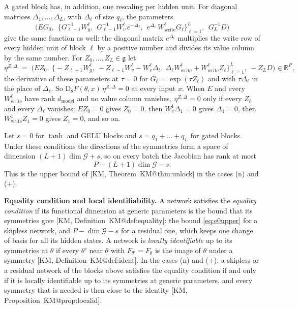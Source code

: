 \documentclass[10pt]{article}
\makeatletter
\theoremstyle{definition}
\theoremstyle{remark}
\newcommand{\R}{\mathbb{R}}
\newcommand{\Wwrite}{W_{\mathrm{write}}}
\newcommand{\dm}{d_{\mathrm{model}}}
\newcommand{\Der}{\mathrm{D}}
\newcommand{\G}{\mathcal{G}}
\newcommand{\para}[1]{\smallskip\noindent\textbf{#1}\hspace{0.5em}}
\newcommand{\KMn}[1]{\csname KM@#1\endcsname}
\newcommand{\KM}[2]{[KM, #1~\KMn{#2}]}
\makeatother
\begin{document}
A gated block has, in addition, one rescaling per hidden unit. For diagonal matrices $\Delta_1, \dots, \Delta_L$, with $\Delta_\ell$ of size $q_\ell$, the parameters
\[
\Big(EG_0,\ \ \big\{G_{\ell-1}^{-1}W_g^{\ell},\ \ G_{\ell-1}^{-1}W_v^{\ell}\,e^{-\Delta_\ell},\ \ e^{\Delta_\ell}\,\Wwrite^{\ell}G_\ell\big\}_{\ell=1}^{L},\ \ G_L^{-1}D\Big)
\]
give the same function as well: the diagonal matrix $e^{\Delta_\ell}$ multiplies the write row of every hidden unit of block $\ell$ by a positive number and divides its value column by the same number. For $Z_0, \dots, Z_L \in \mathfrak g$ let
\begin{equation}\label{eq:gteta}
\eta^{Z,\Delta} \;=\; \Big(EZ_0,\ \big\{-Z_{\ell-1}W_g^{\ell},\ -Z_{\ell-1}W_v^{\ell} - W_v^{\ell}\Delta_\ell,\ \Delta_\ell\Wwrite^{\ell} + \Wwrite^{\ell}Z_\ell\big\}_{\ell=1}^{L},\ -Z_LD\Big) \in \R^P ,
\end{equation}
the derivative of these parameters at $\tau = 0$ for $G_\ell = \exp(\tau Z_\ell)$ and with $\tau\Delta_\ell$ in the place of $\Delta_\ell$. So $\Der_\theta F(\theta, x)\,\eta^{Z,\Delta} = 0$ at every input $x$. When $E$ and every $\Wwrite^{\ell}$ have rank $\dm$ and no value column vanishes, $\eta^{Z,\Delta} = 0$ only if every $Z_\ell$ and every $\Delta_\ell$ vanishes: $EZ_0 = 0$ gives $Z_0 = 0$, then $W_v^{1}\Delta_1 = 0$ gives $\Delta_1 = 0$, then $\Wwrite^{1}Z_1 = 0$ gives $Z_1 = 0$, and so on.

Let $s = 0$ for $\tanh$ and GELU blocks and $s = q_1 + \dots + q_L$ for gated blocks. Under these conditions the directions of the symmetries form a space of dimension $(L+1)\dim\G + s$, so on every batch the Jacobian has rank at most
\begin{equation}\label{eq:e0upper}
P - (L+1)\dim\G - s .
\end{equation}
This is the upper bound of \KM{Theorem}{thm:unlock} in the cases (n) and (+).

\para{Equality condition and local identifiability.} A network satisfies the \emph{equality condition} if its functional dimension at generic parameters is the bound that its symmetries give \KM{Definition}{def:equality}: the bound \eqref{eq:e0upper} for a skipless network, and $P - \dim\G - s$ for a residual one, which keeps one change of basis for all its hidden states. A network is \emph{locally identifiable} up to its symmetries at $\theta$ if every $\theta'$ near $\theta$ with $F_{\theta'} = F_\theta$ is the image of $\theta$ under a symmetry \KM{Definition}{def:ident}. In the cases (n) and (+), a skipless or a residual network of the blocks above satisfies the equality condition if and only if it is locally identifiable up to its symmetries at generic parameters, and every symmetry that is needed is then close to the identity \KM{Proposition}{prop:localid}.
\end{document}
